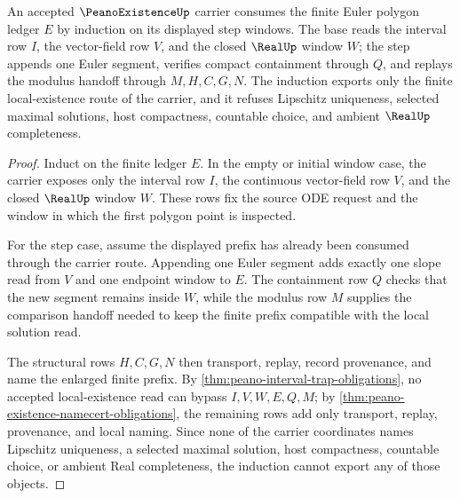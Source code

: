 \begin{theorem}\label{thm:peano-existence-euler-polygon-induction}
An accepted $\PeanoExistenceUp$ carrier consumes the finite Euler polygon ledger $E$ by induction on its displayed step windows. The base reads the interval row $I$, the vector-field row $V$, and the closed $\RealUp$ window $W$; the step appends one Euler segment, verifies compact containment through $Q$, and replays the modulus handoff through $M,H,C,G,N$. The induction exports only the finite local-existence route of the carrier, and it refuses Lipschitz uniqueness, selected maximal solutions, host compactness, countable choice, and ambient $\RealUp$ completeness.
\end{theorem}
\begin{proof}
Induct on the finite ledger $E$. In the empty or initial window case, the carrier exposes only the interval row $I$, the continuous vector-field row $V$, and the closed $\RealUp$ window $W$. These rows fix the source ODE request and the window in which the first polygon point is inspected.

For the step case, assume the displayed prefix has already been consumed through the carrier route. Appending one Euler segment adds exactly one slope read from $V$ and one endpoint window to $E$. The containment row $Q$ checks that the new segment remains inside $W$, while the modulus row $M$ supplies the comparison handoff needed to keep the finite prefix compatible with the local solution read.

The structural rows $H,C,G,N$ then transport, replay, record provenance, and name the enlarged finite prefix. By \autoref{thm:peano-interval-trap-obligations}, no accepted local-existence read can bypass $I,V,W,E,Q,M$; by \autoref{thm:peano-existence-namecert-obligations}, the remaining rows add only transport, replay, provenance, and local naming. Since none of the carrier coordinates names Lipschitz uniqueness, a selected maximal solution, host compactness, countable choice, or ambient Real completeness, the induction cannot export any of those objects.
\end{proof}

